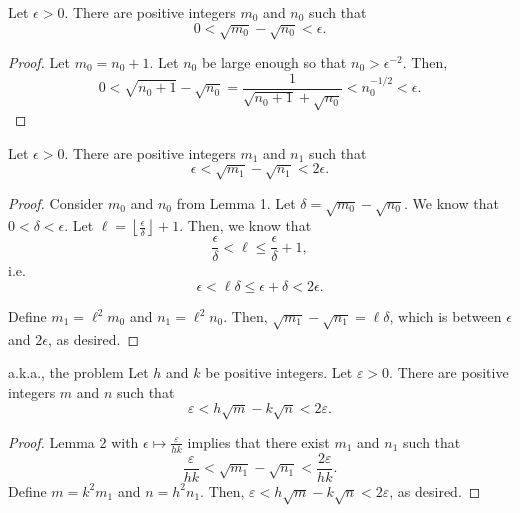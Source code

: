 \begin{sol}{}{}
	\begin{lem}{}{}
	Let $\epsilon >0$. There are positive integers $m_0$ and $n_0$ such that \[0 < \sqrt{m_0}-\sqrt{n_0} < \epsilon.\]
	\end{lem}
	\begin{proof}
		Let \(m_0 = n_0 + 1\). Let \(n_0\) be large enough so that \(n_0 > \epsilon^{-2}\). Then, \[
			0 < \sqrt{n_0 + 1} - \sqrt{n_0} = \frac{1}{\sqrt{n_0+1} + \sqrt{n_0}} < n_0^{-1/2} < \epsilon.
		\]
	\end{proof}
	\begin{lem}{}{}
	Let $\epsilon >0$. There are positive integers $m_1$ and $n_1$ such that \[\epsilon < \sqrt{m_1}-\sqrt{n_1} < 2\epsilon.\]
	\end{lem}
	\begin{proof}
		Consider \(m_0\) and \(n_0\) from Lemma 1. Let \(\delta = \sqrt{m_0} - \sqrt{n_0}\). We know that \(0 < \delta < \epsilon\). Let  \(\ell = \left\lfloor\frac{\epsilon}{\delta}\right\rfloor + 1\). Then, we know that \[
			\frac{\epsilon}{\delta} < \ell \leq \frac{\epsilon}{\delta} + 1,
		\]
		i.e.
		\[
			\epsilon < \ell \delta \leq \epsilon + \delta < 2\epsilon.
		\]

		Define \(m_1 = \ell^2 m_0\) and \(n_1 = \ell^2 n_0\). Then, \(\sqrt{m_1} - \sqrt{n_1} = \ell\delta\), which is between \(\epsilon\) and \(2\epsilon\), as desired.
	\end{proof}
	\begin{lem}{a.k.a., the problem}{}
	Let $h$ and $k$ be positive integers. Let \(\varepsilon > 0\). There are positive integers $m$ and $n$ such that \[\varepsilon < h\sqrt{m}-k\sqrt{n}<2\varepsilon.\]
	\end{lem}
	\begin{proof}
		Lemma 2 with \(\epsilon \mapsto \frac{\varepsilon}{hk}\) implies that there exist \(m_1\) and \(n_1\) such that \[
			\frac{\varepsilon}{hk} < \sqrt{m_1} - \sqrt{n_1} < \frac{2\varepsilon}{hk}.
		\]
		Define \(m = k^2m_1\) and  \(n = h^2n_1\). Then, \( \varepsilon < h\sqrt{m} - k\sqrt{n} < 2\varepsilon\), as desired.
	\end{proof}
\end{sol}
